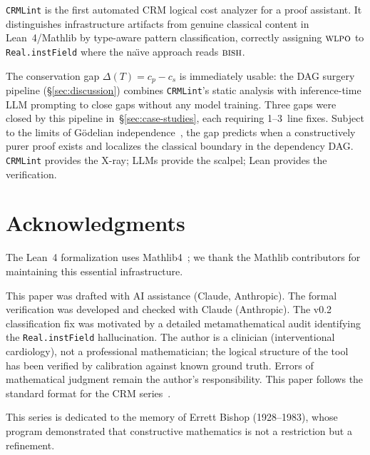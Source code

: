\documentclass[12pt, a4paper]{article}
\theoremstyle{plain}
\theoremstyle{definition}
\theoremstyle{remark}
\newcommand{\BISH}{\textsc{bish}}
\newcommand{\WLPO}{\textsc{wlpo}}
\newcommand{\CRMLint}{\texttt{CRMLint}}
\begin{document}
\CRMLint{} is the first automated CRM logical cost analyzer for
a proof assistant.  It distinguishes infrastructure artifacts from
genuine classical content in Lean~4/Mathlib by type-aware pattern
classification, correctly assigning $\WLPO$ to
\texttt{Real.instField} where the na\"{\i}ve approach reads $\BISH$.

The conservation gap $\Delta(T) = c_p - c_s$ is immediately usable:
the DAG surgery pipeline (\S\ref{sec:discussion}) combines
\CRMLint's static analysis with inference-time LLM prompting to
close gaps without any model training.  Three gaps were closed by
this pipeline in~\S\ref{sec:case-studies}, each requiring 1--3~line
fixes.  Subject to the limits of G\"odelian
independence~\cite{paris-harrington}, the gap predicts when a
constructively purer proof exists and localizes the classical
boundary in the dependency DAG.  \CRMLint{} provides the X-ray;
LLMs provide the scalpel; Lean provides the verification.


\section*{Acknowledgments}

The Lean~4 formalization uses Mathlib4~\cite{mathlib}; we thank the
Mathlib contributors for maintaining this essential infrastructure.

This paper was drafted with AI assistance (Claude, Anthropic).
The formal verification was developed and checked with Claude
(Anthropic).  The v0.2 classification fix was motivated by a
detailed metamathematical audit identifying the \texttt{Real.instField}
hallucination.  The author is a clinician (interventional
cardiology), not a professional mathematician; the logical structure
of the tool has been verified by calibration against known ground
truth.  Errors of mathematical judgment remain the author's
responsibility.  This paper follows the standard format for the CRM
series~\cite{format-guide}.

This series is dedicated to the memory of Errett Bishop (1928--1983),
whose program demonstrated that constructive mathematics is not a
restriction but a refinement.
\end{document}
